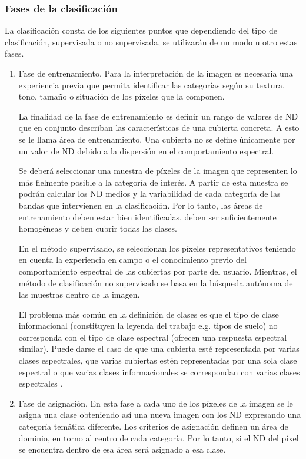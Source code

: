\subsubsection{Fases de la clasificación}
La clasificación consta de los siguientes puntos que dependiendo del tipo de clasificación, supervisada o no supervisada, se utilizarán de un modo u otro estas fases.
\begin{enumerate}
	\item Fase de entrenamiento.
Para la interpretación de la imagen es necesaria una experiencia previa que permita identificar las categorías según su textura, tono, tamaño o situación de los píxeles que la componen.

La finalidad de la fase de entrenamiento es definir un rango de valores de \ac{ND} que en conjunto describan las características de una cubierta concreta. A esto se le llama área de entrenamiento. Una cubierta no se define únicamente por un valor de \ac{ND} debido a la dispersión en el comportamiento espectral.

Se deberá seleccionar una muestra de píxeles de la imagen que representen lo más fielmente posible a la categoría de interés. A partir de esta muestra se podrán calcular los \ac{ND} medios y la variabilidad de cada categoría de las bandas que intervienen en la clasificación. Por lo tanto, las áreas de entrenamiento deben estar bien identificadas, deben ser suficientemente homogéneas y deben cubrir todas las clases.

En el método supervisado, se seleccionan los píxeles representativos teniendo en cuenta la experiencia en campo o el conocimiento previo del comportamiento espectral de las cubiertas por parte del usuario. Mientras, el método de clasificación no supervisado se basa en la búsqueda autónoma de las muestras dentro de la imagen.

El problema más común en la definición de clases es que el tipo de clase informacional (constituyen la leyenda del trabajo e.g. tipos de suelo) no corresponda con el tipo de clase espectral (ofrecen una respuesta espectral similar). Puede darse el caso de que una cubierta esté representada por varias clases espectrales, que varias cubiertas estén representadas por una sola clase espectral o que varias clases informacionales se correspondan con varias clases espectrales \citep{chuvieco2002teledeteccion}.

	\item Fase de asignación.
En esta fase a cada uno de los píxeles de la imagen se le asigna una clase obteniendo así una nueva imagen con los \ac{ND} expresando una categoría temática diferente. Los criterios de asignación definen un área de dominio, en torno al centro de cada categoría. Por lo tanto, si el \ac{ND} del píxel se encuentra dentro de esa área será asignado a esa clase.


\end{enumerate}
